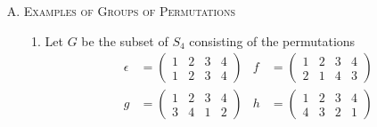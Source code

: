 \documentclass[twoside]{amsart}
\newcommand{\solution}{\textsc{Solution}\xspace}
\begin{document}
\begin{enumerate}[A.]
\begin{enumerate}[1]
      \item $h \circ g^{-1} \circ f^{-1}$

      \solution
      \begin{align*}
         h \circ g^{-1} \circ f^{-1} & = \begin{pmatrix}
	                                    1 & 2 & 3 & 4 & 5 & 6 \\
					    3 & 4 & 1 & 5 & 2 & 6
	                                 \end{pmatrix}
      \end{align*}

      \item $g \circ g \circ g$

      \solution
      \begin{align*}
         g \circ g \circ g & = \begin{pmatrix}
	                          1 & 2 & 3 & 4 & 5 & 6 \\
				  1 & 2 & 3 & 4 & 5 & 6
	                       \end{pmatrix}
      \end{align*}
   \end{enumerate}

   \item \textsc{Examples of Groups of Permutations}

   \begin{enumerate}[1]
      \item Let $G$ be the subset of $S_4$ consisting of the permutations
      \begin{align*}
         \epsilon & =  \begin{pmatrix}
	                 1 & 2 & 3 & 4 \\
			 1 & 2 & 3 & 4
	              \end{pmatrix}
		      &
         f        & = \begin{pmatrix}
	                 1 & 2 & 3 & 4 \\
			 2 & 1 & 4 & 3
		      \end{pmatrix} \\
         g        & = \begin{pmatrix}
	                 1 & 2 & 3 & 4 \\
			 3 & 4 & 1 & 2
		      \end{pmatrix}
		      &
         h        & = \begin{pmatrix}
	                 1 & 2 & 3 & 4 \\
			 4 & 3 & 2 & 1
		      \end{pmatrix}
      \end{align*}


\end{enumerate}
\end{enumerate}
\end{document}
